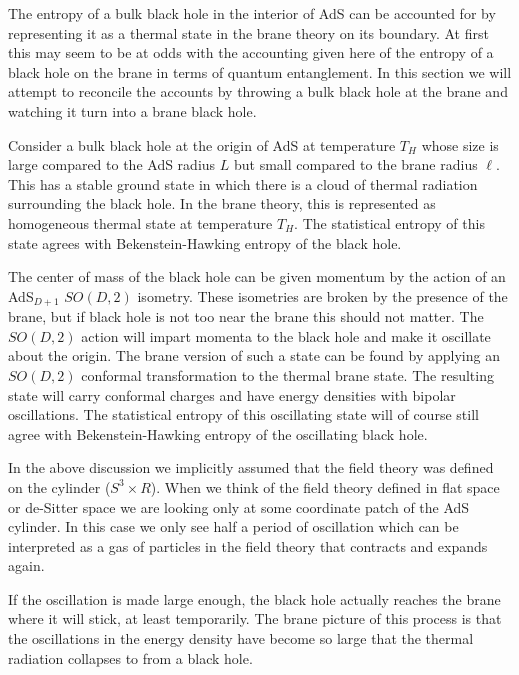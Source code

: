 
The entropy of a bulk black hole in the interior of AdS can be  
accounted for by representing it as a thermal state in the brane 
theory on its boundary. At first this may seem to be at odds with the 
accounting given here of the entropy of a black hole on the 
brane in terms of quantum entanglement. In this section we will 
attempt to reconcile the accounts by throwing a bulk black hole at the
brane and watching it turn into a brane black hole.  


Consider a bulk black hole at the origin of AdS at temperature 
$T_H$ whose size is large
compared to the AdS radius $L$ but small compared to the brane radius 
$\ell$. This has a stable ground state in which there is a cloud of 
thermal radiation surrounding the black hole. In the brane theory, 
this is represented as homogeneous thermal state at temperature $T_H$. 
The statistical entropy of this state agrees with Bekenstein-Hawking 
entropy of the black hole.

The center of mass of the black hole can be given momentum by 
the action of an AdS$_{D+1}$ $SO(D,2)$ isometry. These isometries are broken
by the 
presence of the brane, but if black hole is not too near the brane 
this should not matter. The $SO(D,2)$  action will 
impart momenta to the black hole and make it
oscillate about the origin. The brane version of such a state 
can be found by applying an $SO(D,2)$ conformal transformation to the thermal 
brane state. The resulting state will carry conformal charges and 
have energy densities with bipolar oscillations. 
The statistical entropy of this 
oscillating state will of course still agree with Bekenstein-Hawking 
entropy of the oscillating black hole.   

In the above discussion we implicitly assumed that the field theory was defined 
on the cylinder ($S^3 \times R$).
 When we think of the field theory defined in 
flat space or de-Sitter space we are looking only at some coordinate 
patch of the AdS cylinder.  
In this case we only see half a period of oscillation which can be
interpreted
as a gas of particles in the field theory that contracts and expands
again. 

If the oscillation is  made large enough, the black hole actually reaches
the brane where it will stick, at least temporarily. The brane picture of
this process is that the oscillations in the energy density have become so
large that the thermal radiation collapses to from a black 
hole.


